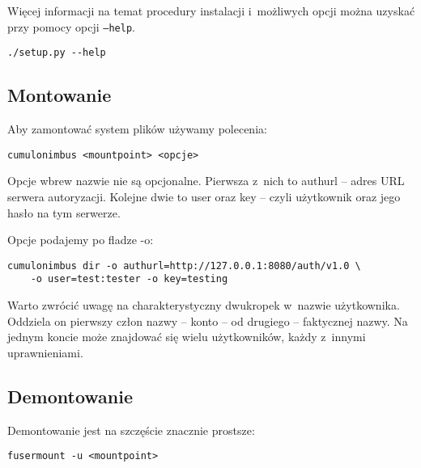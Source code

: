 Więcej informacji na temat procedury instalacji i~możliwych opcji można uzyskać
przy pomocy opcji \texttt{--help}.

\begin{verbatim}
./setup.py --help
\end{verbatim}

\subsection{Montowanie}

Aby zamontować system plików używamy polecenia:

\begin{verbatim}
cumulonimbus <mountpoint> <opcje>
\end{verbatim}

Opcje wbrew nazwie nie są opcjonalne. Pierwsza z~nich to authurl -- adres URL
serwera autoryzacji. Kolejne dwie to user oraz key -- czyli użytkownik oraz
jego hasło na tym serwerze.

Opcje podajemy po fladze -o:

\begin{verbatim}
cumulonimbus dir -o authurl=http://127.0.0.1:8080/auth/v1.0 \
    -o user=test:tester -o key=testing
\end{verbatim}

Warto zwrócić uwagę na charakterystyczny dwukropek w~nazwie użytkownika.
Oddziela on pierwszy człon nazwy -- konto -- od drugiego -- faktycznej nazwy.
Na jednym koncie może znajdować się wielu użytkowników, każdy z~innymi
uprawnieniami.

\subsection{Demontowanie}

Demontowanie jest na szczęście znacznie prostsze:

\begin{verbatim}
fusermount -u <mountpoint>
\end{verbatim}
